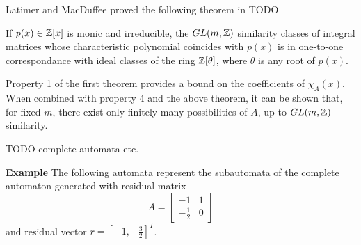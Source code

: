 \documentclass[11pt]{article}
\begin{document}
Latimer and MacDuffee proved the following theorem in TODO

\begin{theorem}
  If $p(x) \in \mathbb{Z}[x]$ is monic and irreducible, the $GL(m, \mathbb{Z})$
  similarity classes of integral matrices whose characteristic
  polynomial coincides with $p(x)$ is in one-to-one correspondance
  with ideal classes of the ring $\mathbb{Z}[\theta]$, where $\theta$ is any
  root of $p(x)$.
\end{theorem}

Property 1 of the first theorem provides a bound on the coefficients
of $\chi_A(x)$. When combined with property 4 and the above theorem,
it can be shown that, for fixed $m$, there exist only finitely many
possibilities of $A$, up to $GL(m, \mathbb{Z})$ similarity.

TODO complete automata etc.

\textbf{Example} The following automata represent the subautomata of the complete automaton generated with residual matrix
\[
  A = \begin{bmatrix}
    -1 &1\\
    -\frac{1}{2} & 0
    \end{bmatrix}
\]
and residual vector $r = [-1, -\frac{3}{2}]^T$.
\end{document}
